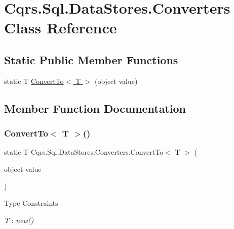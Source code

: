\hypertarget{classCqrs_1_1Sql_1_1DataStores_1_1Converters}{}\section{Cqrs.\+Sql.\+Data\+Stores.\+Converters Class Reference}
\label{classCqrs_1_1Sql_1_1DataStores_1_1Converters}
\subsection*{Static Public Member Functions}
\begin{DoxyCompactItemize}
\item 
static T \hyperlink{classCqrs_1_1Sql_1_1DataStores_1_1Converters_a40b58c9a649e6c55ec973ab8fc4e1291}{Convert\+To$<$ T $>$} (object value)
\end{DoxyCompactItemize}


\subsection{Member Function Documentation}
\mbox{\label{classCqrs_1_1Sql_1_1DataStores_1_1Converters_a40b58c9a649e6c55ec973ab8fc4e1291}} 
\subsubsection{\texorpdfstring{Convert\+To$<$ T $>$()}{ConvertTo< T >()}}
{\footnotesize\ttfamily static T Cqrs.\+Sql.\+Data\+Stores.\+Converters.\+Convert\+To$<$ T $>$ (\begin{DoxyParamCaption}\item[{object}]{value }\end{DoxyParamCaption})\hspace{0.3cm}{\ttfamily [static]}}

\begin{Desc}
\item[Type Constraints]\begin{description}
\item[{\em T} : {\em new()}]\end{description}
\end{Desc}
